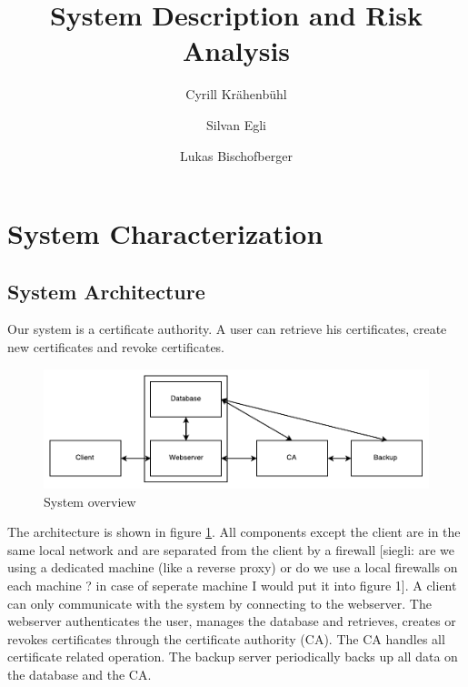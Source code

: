 \documentclass[english]{article}
\title{\huge\sffamily\bfseries System Description and Risk Analysis}
\author{Cyrill Kr\"ahenb\"uhl \and Silvan Egli \and Lukas Bischofberger }
\date{}
\begin{document}
\maketitle

\begin{center}
\end{center}

\tableofcontents
\pagebreak


\section{System Characterization}

\subsection{System Architecture}

Our system is a certificate authority. A user can retrieve his certificates, create new certificates and revoke certificates.

\begin{figure}[ht]
	\centering
	\includegraphics[scale=0.7]{seclabsystemoverview.pdf}
	\caption{System overview}
	\label{figure:systemoverview}
\end{figure}

The architecture is shown in figure \ref{figure:systemoverview}. All components except the client are in the same local network and are separated from the client by a firewall [siegli: are we using a dedicated machine (like a reverse proxy) or do we use a local firewalls on each machine ? in case of seperate machine I would put it into figure 1]. A client can only communicate with the system by connecting to the webserver. The webserver authenticates the user, manages the database and retrieves, creates or revokes certificates through the certificate authority (CA). The CA handles all certificate related operation. The backup server periodically backs up all data on the database and the CA.
\end{document}
